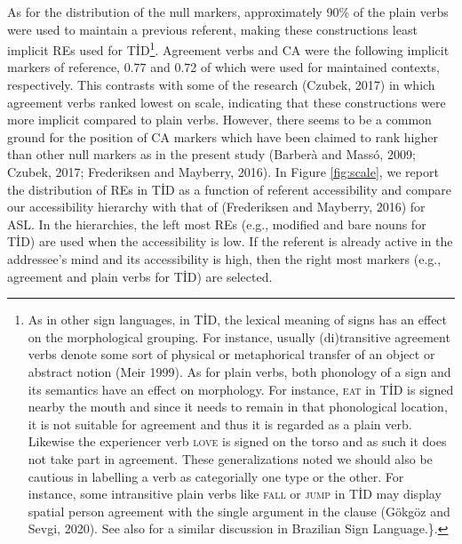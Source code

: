 \documentclass[]{elsarticle} %
\begin{document}
As for the distribution of the null markers, approximately 90\% of the
plain verbs were used to maintain a previous referent, making these
constructions least implicit REs used for TİD\footnote{As in other sign
  languages, in TİD, the lexical meaning of signs has an effect on the
  morphological grouping. For instance, usually (di)transitive agreement
  verbs denote some sort of physical or metaphorical transfer of an
  object or abstract notion (Meir 1999). As for plain verbs, both
  phonology of a sign and its semantics have an effect on morphology.
  For instance, \textsc{eat} in TİD is signed nearby the mouth and since
  it needs to remain in that phonological location, it is not suitable
  for agreement and thus it is regarded as a plain verb. Likewise the
  experiencer verb \textsc{love} is signed on the torso and as such it
  does not take part in agreement. These generalizations noted we should
  also be cautious in labelling a verb as categorially one type or the
  other. For instance, some intransitive plain verbs like \textsc{fall}
  or \textsc{jump} in TİD may display spatial person agreement with the
  single argument in the clause (Gökgöz and Sevgi, 2020). See also for a
  similar discussion in Brazilian Sign Language.\}.}. Agreement verbs
and CA were the following implicit markers of reference, 0.77 and 0.72
of which were used for maintained contexts, respectively. This contrasts
with some of the research (Czubek, 2017) in which agreement verbs ranked
lowest on scale, indicating that these constructions were more implicit
compared to plain verbs. However, there seems to be a common ground for
the position of CA markers which have been claimed to rank higher than
other null markers as in the present study (Barberà and Massó, 2009;
Czubek, 2017; Frederiksen and Mayberry, 2016). In Figure
\ref{fig:scale}, we report the distribution of REs in TİD as a function
of referent accessibility and compare our accessibility hierarchy with
that of (Frederiksen and Mayberry, 2016) for ASL. In the hierarchies,
the left most REs (e.g., modified and bare nouns for TİD) are used when
the accessibility is low. If the referent is already active in the
addressee's mind and its accessibility is high, then the right most
markers (e.g., agreement and plain verbs for TİD) are selected.
\end{document}
